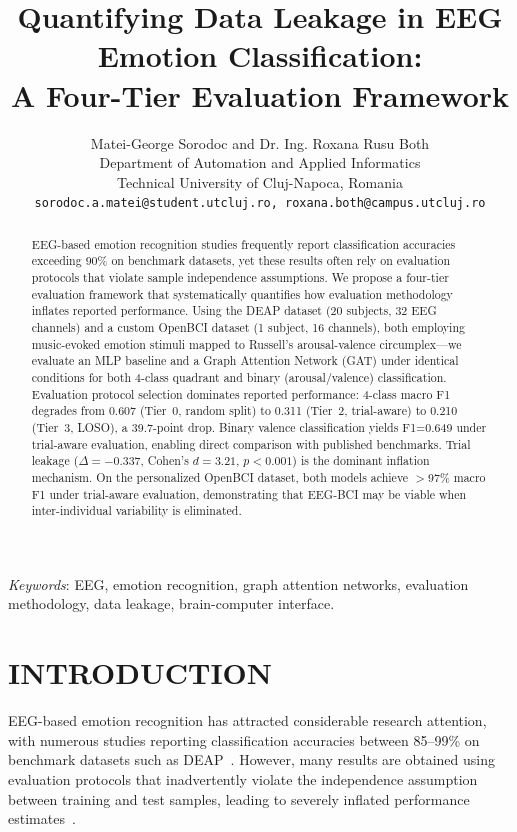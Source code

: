 \documentclass[a4paper, 10pt, conference]{ieeeconf}
\title{\LARGE \bf
Quantifying Data Leakage in EEG Emotion Classification:\\A Four-Tier Evaluation Framework
}
\author{Matei-George Sorodoc and Dr. Ing. Roxana Rusu Both\\
Department of Automation and Applied Informatics\\
Technical University of Cluj-Napoca, Romania\\
{\tt\small sorodoc.a.matei@student.utcluj.ro, roxana.both@campus.utcluj.ro}}
\begin{document}
\maketitle
\thispagestyle{empty}
\pagestyle{empty}

\begin{abstract}
EEG-based emotion recognition studies frequently report classification accuracies exceeding 90\% on benchmark datasets, yet these results often rely on evaluation protocols that violate sample independence assumptions. We propose a four-tier evaluation framework that systematically quantifies how evaluation methodology inflates reported performance. Using the DEAP dataset (20 subjects, 32 EEG channels) and a custom OpenBCI dataset (1 subject, 16 channels), both employing music-evoked emotion stimuli mapped to Russell's arousal-valence circumplex---we evaluate an MLP baseline and a Graph Attention Network (GAT) under identical conditions for both 4-class quadrant and binary (arousal/valence) classification. Evaluation protocol selection dominates reported performance: 4-class macro F1 degrades from 0.607 (Tier~0, random split) to 0.311 (Tier~2, trial-aware) to 0.210 (Tier~3, LOSO), a 39.7-point drop. Binary valence classification yields F1=0.649 under trial-aware evaluation, enabling direct comparison with published benchmarks. Trial leakage ($\Delta=-0.337$, Cohen's $d=3.21$, $p<0.001$) is the dominant inflation mechanism. On the personalized OpenBCI dataset, both models achieve $>$97\% macro F1 under trial-aware evaluation, demonstrating that EEG-BCI may be viable when inter-individual variability is eliminated.
\end{abstract}

\noindent\textit{Keywords}: EEG, emotion recognition, graph attention networks, evaluation methodology, data leakage, brain-computer interface.

\section{INTRODUCTION}

EEG-based emotion recognition has attracted considerable research attention, with numerous studies reporting classification accuracies between 85--99\% on benchmark datasets such as DEAP~\cite{koelstra2012}. However, many results are obtained using evaluation protocols that inadvertently violate the independence assumption between training and test samples, leading to severely inflated performance estimates~\cite{varoquaux2017, roberts2017}.
\end{document}
